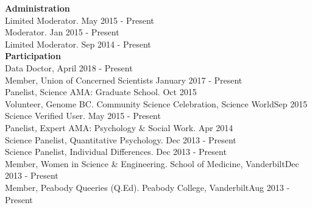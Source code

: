 {\large \textbf{Administration}}\\
Limited Moderator. \href{http://www.reddit.com/r/Science}{\color{blue}{Science, Reddit.com}}\hfill{May 2015 - Present}\smallskip\\
Moderator. \href{http://www.reddit.com/r/GradAdmissions}{\color{blue}{GradAdmissions, Reddit.com}}\hfill{Jan 2015 - Present}\smallskip\\
Limited Moderator. \href{http://www.reddit.com/r/AskScience}{\color{blue}{AskScience, Reddit.com}}\hfill{Sep 2014 - Present}\medskip\\
%
%
{\large \textbf{Participation}}\\
Data Doctor, \href{https://www.wikitree.com}{\color{blue}{WikiTree}} \hfill{April 2018 - Present}\smallskip\\
Member, Union of Concerned Scientists \hfill{January 2017 - Present}\smallskip\\
Panelist, Science AMA: Graduate School. \href{http://www.reddit.com/r/AskScience}{\color{blue}{AskScience, Reddit.com}}\hfill{Oct 2015}\smallskip\\
Volunteer, Genome BC. Community Science Celebration, Science World\hfill{Sep 2015}\smallskip\\
Science Verified User. \href{http://www.reddit.com/r/science}{\color{blue}{Science, Reddit.com}}\hfill{May 2015 - Present}\smallskip\\
Panelist, Expert AMA: Psychology \& Social Work. \href{http://www.reddit.com/r/AskSocialScience}{\color{blue}{AskSocialScience, Reddit.com}}\hfill{Apr 2014}\smallskip\\
Science Panelist, Quantitative Psychology. \href{http://www.reddit.com/r/AskScience}{\color{blue}{AskScience, Reddit.com}}\hfill{Dec 2013 - Present}\smallskip\\%
Science Panelist, Individual Differences. \href{http://www.reddit.com/r/AskSocialScience}{\color{blue}{AskSocialScience, Reddit.com}}\hfill{Dec 2013 - Present}\smallskip\\
Member, Women in Science \& Engineering. School of Medicine, Vanderbilt\hfill{Dec 2013 - Present}\smallskip\\
Member, Peabody Queeries (Q.Ed). Peabody College, Vanderbilt\hfill{Aug 2013 - Present}%
%
%
